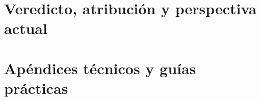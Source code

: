 \documentclass[10pt,twoside,openright]{book}
\begin{document}
\part{Veredicto, atribución y perspectiva actual}




\appendix
\part{Apéndices técnicos y guías prácticas}







\backmatter




\end{document}
